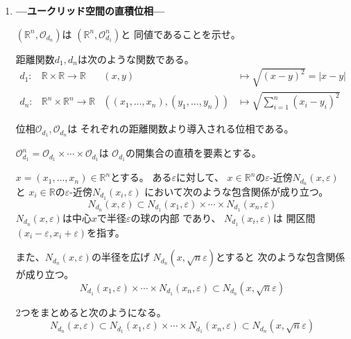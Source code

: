 \documentclass[12pt,b5paper]{ltjsarticle}
\begin{document}
\begin{enumerate}
 \item
      \textbf{---ユークリッド空間の直積位相---}
      
      $(\mathbb{R}^n,\mathcal{O}_{d_{n}})$は
      $(\mathbb{R}^n,\mathcal{O}_{d_{1}}^n)$と
      同値であることを示せ。

      \dotfill

      距離関数$d_{1},d_{n}$は次のような関数である。
      \begin{align}
       d_{1}:&\mathbb{R}\times\mathbb{R} \to \mathbb{R}
       & (x,y) & \mapsto \sqrt{(x-y)^2}=\lvert x-y \rvert\\
       d_{n}:&\mathbb{R}^n\times\mathbb{R}^n \to \mathbb{R}
       & ((x_1,\dots,x_n),(y_1,\dots,y_n))
       & \mapsto \sqrt{\sum_{i=1}^n(x_i-y_i)^2}
      \end{align}

      位相$\mathcal{O}_{d_{1}},\mathcal{O}_{d_{n}}$は
      それぞれの距離関数より導入される位相である。

      $\mathcal{O}_{d_{1}}^n
      =\mathcal{O}_{d_{1}}\times\cdots\times\mathcal{O}_{d_{1}}$は
      $\mathcal{O}_{d_1}$の開集合の直積を要素とする。

      \dotfill

      $x=(x_1,\dots,x_n)\in\mathbb{R}^n$とする。
      ある$\varepsilon$に対して、
      $x\in\mathbb{R}^n$の$\varepsilon$-近傍$N_{d_n}(x,\varepsilon)$
      と
      $x_i\in\mathbb{R}$の$\varepsilon$-近傍$N_{d_1}(x_i,\varepsilon)$
      において次のような包含関係が成り立つ。
      \begin{equation}
       N_{d_n}(x,\varepsilon)
        \subset N_{d_1}(x_1,\varepsilon)
        \times\cdots\times N_{d_1}(x_n,\varepsilon)
      \end{equation}
      $N_{d_n}(x,\varepsilon)$は中心$x$で半径$\varepsilon$の球の内部
      であり、
      $N_{d_1}(x_i,\varepsilon)$は
      開区間$(x_i-\varepsilon , x_i+\varepsilon)$を指す。


      また、$N_{d_n}(x,\varepsilon)$の半径を広げ
      $N_{d_n}(x,\sqrt{n}\varepsilon)$とすると
      次のような包含関係が成り立つ。
      \begin{equation}
        N_{d_1}(x_1,\varepsilon)
        \times\cdots\times N_{d_1}(x_n,\varepsilon)
        \subset N_{d_n}(x,\sqrt{n}\varepsilon)
      \end{equation}

      2つをまとめると次のようになる。
      \begin{equation}
       N_{d_n}(x,\varepsilon)
        \subset N_{d_1}(x_1,\varepsilon)
        \times\cdots\times N_{d_1}(x_n,\varepsilon)
        \subset N_{d_n}(x,\sqrt{n}\varepsilon)
      \end{equation}


\end{enumerate}
\end{document}
